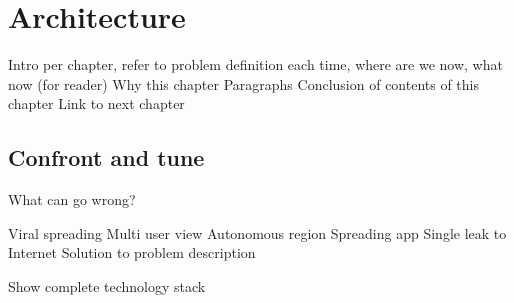 \chapter{Architecture}


Intro per chapter, refer to problem definition each time, where are we now, what now (for reader)
Why this chapter
Paragraphs
Conclusion of contents of this chapter
Link to next chapter





\section{Confront and tune} %

What can go wrong?



Viral spreading
Multi user view
Autonomous region
Spreading app
Single leak to Internet
Solution to problem description


Show complete technology stack


